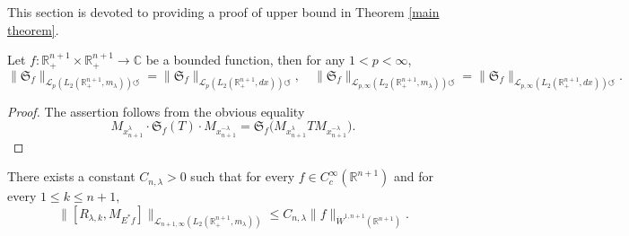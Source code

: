 \documentclass[12pt]{amsart}
\begin{document}
This section is devoted to providing a proof of upper bound in Theorem \ref{main theorem}.
{\color{blue}
\begin{lemma}\label{schurweight}
Let $f:\mathbb{R}_+^{n+1}\times \mathbb{R}_+^{n+1}\rightarrow \mathbb{C}$ be a bounded function, then for any $1<p<\infty$,
$$\|\mathfrak{S}_{f}\|_{\mathcal{L}_{p}(L_2(\mathbb{R}^{n+1}_+,m_{\lambda}))\circlearrowleft}=\|\mathfrak{S}_{f}\|_{\mathcal{L}_{p}(L_2(\mathbb{R}^{n+1}_+,dx))\circlearrowleft},\quad\|\mathfrak{S}_{f}\|_{\mathcal{L}_{p,\infty}(L_2(\mathbb{R}^{n+1}_+,m_{\lambda}))\circlearrowleft}=\|\mathfrak{S}_{f}\|_{\mathcal{L}_{p,\infty}(L_2(\mathbb{R}^{n+1}_+,dx))\circlearrowleft}.$$
\end{lemma}
\begin{proof} The assertion follows from the obvious equality
$$M_{x_{n+1}^{\lambda}}\cdot\mathfrak{S}_{f}(T)\cdot M_{x_{n+1}^{-\lambda}}=\mathfrak{S}_{f}\Big(M_{x_{n+1}^{\lambda}}TM_{x_{n+1}^{-\lambda}}\Big).$$
\end{proof}
}
\begin{lemma}\label{mta final lemma} There exists a constant $C_{n,\lambda}>0$ such that for every $f\in C^{\infty}_c(\mathbb{R}^{n+1})$ and for every $1\leq k\leq n+1,$
$$\|[R_{\lambda,k},M_{E^{\ast}f}]\|_{\mathcal{L}_{n+1,\infty}(L_2(\mathbb{R}^{n+1}_+,m_{\lambda}))}\leq C_{n,\lambda}\|f\|_{\dot{W}^{1,n+1}(\mathbb{R}^{n+1})}.$$
\end{lemma}
\end{document}
